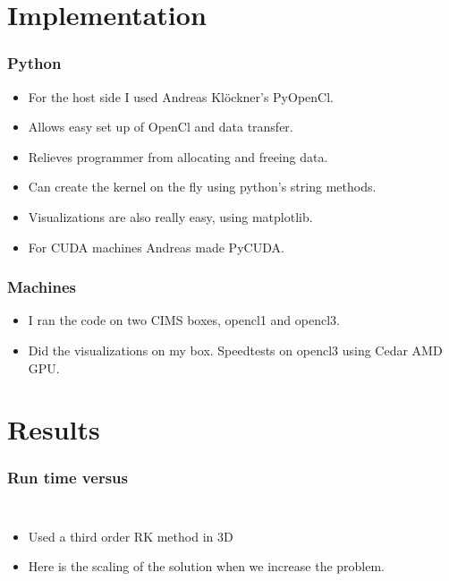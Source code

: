 \documentclass[]{beamer}
\begin{document}
\section{Implementation}
\begin{frame}
  \frametitle{Python}   %

  \begin{itemize}
  \item<1-> For the host side I used Andreas Kl\"ockner's PyOpenCl.
  \item<2-> Allows easy set up of OpenCl and data transfer.
  \item<3-> Relieves programmer from allocating and freeing data.
  \item<4-> Can create the kernel on the fly using python's string methods.
  \item<5-> Visualizations are also really easy, using matplotlib.
  \item<6-> For CUDA machines Andreas made PyCUDA.
  \end{itemize}
\end{frame}

\begin{frame}
  \frametitle{Machines}   %

  \begin{itemize}
  \item<1-> I ran the code on two CIMS boxes, opencl1 and opencl3. 
  \item<2-> Did the visualizations on my box. Speedtests on opencl3 using Cedar AMD GPU. 
  \end{itemize}
\end{frame}

\section{Results}
\begin{frame}
  \frametitle{Run time versus}   %
  \begin{columns}[c]
  \column{2in}  %
  \begin{itemize}
  \item<1-> Used a third order RK method in 3D
  \item<2-> Here is the scaling of the solution when we increase the problem.
  \end{itemize}
  \column{2in}
  \end{columns}
\end{frame}
\end{document}

